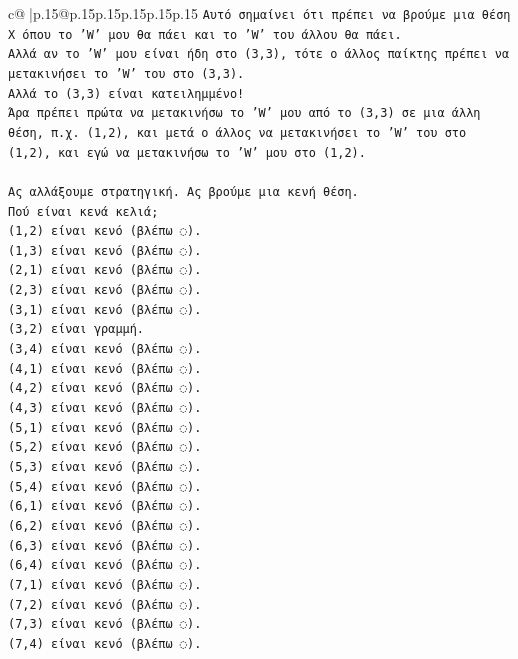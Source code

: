 \documentclass{article}
\begin{document}
{\begin{supertabular}{c@{$\;$}|p{.15\linewidth}@{}p{.15\linewidth}p{.15\linewidth}p{.15\linewidth}p{.15\linewidth}p{.15\linewidth}}
{{{\texttt{Αυτό σημαίνει ότι πρέπει να βρούμε μια θέση X όπου το 'W' μου θα πάει και το 'W' του άλλου θα πάει.} \\
\texttt{Αλλά αν το 'W' μου είναι ήδη στο (3,3), τότε ο άλλος παίκτης πρέπει να μετακινήσει το 'W' του στο (3,3).} \\
\texttt{Αλλά το (3,3) είναι κατειλημμένο!} \\
\texttt{Άρα πρέπει πρώτα να μετακινήσω το 'W' μου από το (3,3) σε μια άλλη θέση, π.χ. (1,2), και μετά ο άλλος να μετακινήσει το 'W' του στο (1,2), και εγώ να μετακινήσω το 'W' μου στο (1,2).} \\
\\ 
\texttt{Ας αλλάξουμε στρατηγική. Ας βρούμε μια κενή θέση.} \\
\texttt{Πού είναι κενά κελιά;} \\
\texttt{(1,2) είναι κενό (βλέπω ◌).} \\
\texttt{(1,3) είναι κενό (βλέπω ◌).} \\
\texttt{(2,1) είναι κενό (βλέπω ◌).} \\
\texttt{(2,3) είναι κενό (βλέπω ◌).} \\
\texttt{(3,1) είναι κενό (βλέπω ◌).} \\
\texttt{(3,2) είναι γραμμή.} \\
\texttt{(3,4) είναι κενό (βλέπω ◌).} \\
\texttt{(4,1) είναι κενό (βλέπω ◌).} \\
\texttt{(4,2) είναι κενό (βλέπω ◌).} \\
\texttt{(4,3) είναι κενό (βλέπω ◌).} \\
\texttt{(5,1) είναι κενό (βλέπω ◌).} \\
\texttt{(5,2) είναι κενό (βλέπω ◌).} \\
\texttt{(5,3) είναι κενό (βλέπω ◌).} \\
\texttt{(5,4) είναι κενό (βλέπω ◌).} \\
\texttt{(6,1) είναι κενό (βλέπω ◌).} \\
\texttt{(6,2) είναι κενό (βλέπω ◌).} \\
\texttt{(6,3) είναι κενό (βλέπω ◌).} \\
\texttt{(6,4) είναι κενό (βλέπω ◌).} \\
\texttt{(7,1) είναι κενό (βλέπω ◌).} \\
\texttt{(7,2) είναι κενό (βλέπω ◌).} \\
\texttt{(7,3) είναι κενό (βλέπω ◌).} \\
\texttt{(7,4) είναι κενό (βλέπω ◌).} \\
}}}
\end{supertabular}}
\end{document}
